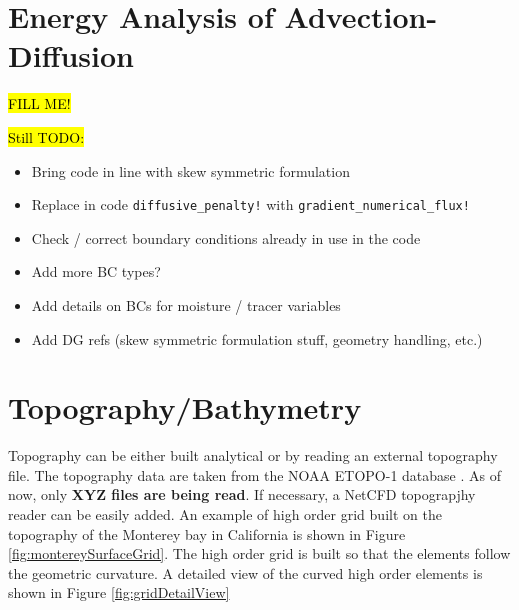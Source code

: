 \documentclass{report}
\begin{document}
\section{Energy Analysis of Advection-Diffusion}
\hl{FILL ME\@!}

\hl{Still TODO\@:}
\begin{itemize}
  \item Bring code in line with skew symmetric formulation
  \item Replace in code \texttt{diffusive\_penalty!} with
    \texttt{gradient\_numerical\_flux!}
  \item Check / correct boundary conditions already in use in the code
  \item Add more BC types?
  \item Add details on BCs for moisture / tracer variables
  \item Add DG refs (skew symmetric formulation stuff, geometry handling, etc.)
\end{itemize}

\section{Topography/Bathymetry}
Topography can be either built analytical or by reading an external topography file. The topography data are taken from the NOAA ETOPO-1 database \cite{etopo1}. As of now, only {\bf XYZ files are being read}. If necessary, a NetCFD topograpjhy reader can be easily added.
An example of high order grid built on the topography of the Monterey bay in California is shown in Figure \ref{fig:montereySurfaceGrid}. The high order grid is built so that the elements follow the geometric curvature. A detailed view of the curved high order elements is shown in Figure \ref{fig:gridDetailView}
\end{document}
